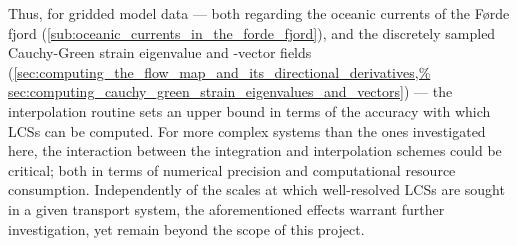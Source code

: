 Thus, for gridded model data --- both regarding the oceanic currents of the
Førde fjord (\cref{sub:oceanic_currents_in_the_forde_fjord}), and the
discretely sampled Cauchy-Green strain eigenvalue and -vector fields
(\cref{sec:computing_the_flow_map_and_its_directional_derivatives,%
sec:computing_cauchy_green_strain_eigenvalues_and_vectors}) --- the
interpolation routine sets an upper bound in terms of the accuracy with which
LCSs can be computed. For more complex systems than the ones investigated here,
the interaction between the integration and interpolation schemes could be
critical; both in terms of numerical precision and computational resource
consumption. Independently of the scales at which well-resolved LCSs are sought
in a given transport system, the aforementioned effects warrant further
investigation, yet remain beyond the scope of this project.
